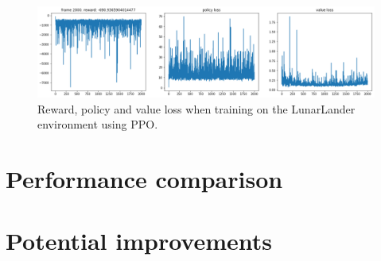 \documentclass[a4paper]{article}
\begin{document}
\begin{figure}[H]
    \centering
    \includegraphics[width=\linewidth]{plots/LL_PPO.png}
    \caption{Reward, policy and value loss when training on the LunarLander environment using PPO.}
    \label{fig:LL_PPO}
\end{figure}


\section{Performance comparison}

\section{Potential improvements}


\printbibliography
\end{document}
